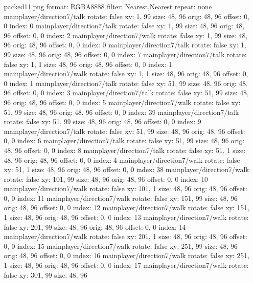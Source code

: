 packed11.png
format: RGBA8888
filter: Nearest,Nearest
repeat: none
mainplayer/direction7/talk
  rotate: false
  xy: 1, 99
  size: 48, 96
  orig: 48, 96
  offset: 0, 0
  index: 0
mainplayer/direction7/talk
  rotate: false
  xy: 1, 99
  size: 48, 96
  orig: 48, 96
  offset: 0, 0
  index: 2
mainplayer/direction7/walk
  rotate: false
  xy: 1, 99
  size: 48, 96
  orig: 48, 96
  offset: 0, 0
  index: 0
mainplayer/direction7/talk
  rotate: false
  xy: 1, 99
  size: 48, 96
  orig: 48, 96
  offset: 0, 0
  index: 7
mainplayer/direction7/talk
  rotate: false
  xy: 1, 1
  size: 48, 96
  orig: 48, 96
  offset: 0, 0
  index: 1
mainplayer/direction7/walk
  rotate: false
  xy: 1, 1
  size: 48, 96
  orig: 48, 96
  offset: 0, 0
  index: 1
mainplayer/direction7/talk
  rotate: false
  xy: 51, 99
  size: 48, 96
  orig: 48, 96
  offset: 0, 0
  index: 3
mainplayer/direction7/talk
  rotate: false
  xy: 51, 99
  size: 48, 96
  orig: 48, 96
  offset: 0, 0
  index: 5
mainplayer/direction7/walk
  rotate: false
  xy: 51, 99
  size: 48, 96
  orig: 48, 96
  offset: 0, 0
  index: 39
mainplayer/direction7/talk
  rotate: false
  xy: 51, 99
  size: 48, 96
  orig: 48, 96
  offset: 0, 0
  index: 9
mainplayer/direction7/talk
  rotate: false
  xy: 51, 99
  size: 48, 96
  orig: 48, 96
  offset: 0, 0
  index: 6
mainplayer/direction7/talk
  rotate: false
  xy: 51, 99
  size: 48, 96
  orig: 48, 96
  offset: 0, 0
  index: 8
mainplayer/direction7/talk
  rotate: false
  xy: 51, 1
  size: 48, 96
  orig: 48, 96
  offset: 0, 0
  index: 4
mainplayer/direction7/walk
  rotate: false
  xy: 51, 1
  size: 48, 96
  orig: 48, 96
  offset: 0, 0
  index: 38
mainplayer/direction7/walk
  rotate: false
  xy: 101, 99
  size: 48, 96
  orig: 48, 96
  offset: 0, 0
  index: 10
mainplayer/direction7/walk
  rotate: false
  xy: 101, 1
  size: 48, 96
  orig: 48, 96
  offset: 0, 0
  index: 11
mainplayer/direction7/walk
  rotate: false
  xy: 151, 99
  size: 48, 96
  orig: 48, 96
  offset: 0, 0
  index: 12
mainplayer/direction7/walk
  rotate: false
  xy: 151, 1
  size: 48, 96
  orig: 48, 96
  offset: 0, 0
  index: 13
mainplayer/direction7/walk
  rotate: false
  xy: 201, 99
  size: 48, 96
  orig: 48, 96
  offset: 0, 0
  index: 14
mainplayer/direction7/walk
  rotate: false
  xy: 201, 1
  size: 48, 96
  orig: 48, 96
  offset: 0, 0
  index: 15
mainplayer/direction7/walk
  rotate: false
  xy: 251, 99
  size: 48, 96
  orig: 48, 96
  offset: 0, 0
  index: 16
mainplayer/direction7/walk
  rotate: false
  xy: 251, 1
  size: 48, 96
  orig: 48, 96
  offset: 0, 0
  index: 17
mainplayer/direction7/walk
  rotate: false
  xy: 301, 99
  size: 48, 96

